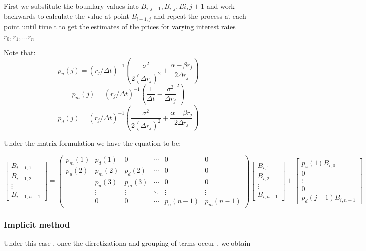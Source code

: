 \documentclass[12pt,a4paper]{article}
\begin{document}
First we substitute the boundary values into $B_{i,j-1}, B_{i,j}, B{i,j+1}$ and work backwards to calculate the value at point $B_{i-1,j}$ and repeat the process at each point until time t to get the estimates of the prices for varying interest rates $r_0,r_1,...r_n$ 

Note that:       
$$p_u(j)=(r_j/\Delta t)^{-1}(\frac{\sigma^{2}}{2(\Delta r_j)^{2}}+\frac{\alpha-\beta r_j}{2\Delta r_j})$$
$$p_m(j)=(r_j/\Delta t)^{-1}(\frac{1}{\Delta t}-\frac{\sigma^2}{\Delta r_j}^{2})$$
$$p_d(j)=(r_j/\Delta t)^{-1}(\frac{\sigma^{2}}{2(\Delta r_j)^{2}}+\frac{\alpha-\beta r_j}{2\Delta r_j})$$

Under the matrix formulation we have the equation to be:

$$\begin{bmatrix}
	B_{i-1,1} \\
	B_{i-1,2} \\
	\vdots \\       
	B_{i-1,n-1}
	\end{bmatrix}
=
\left( \begin{array}{cccccc}
p_m(1) & p_d(1) & 0 & \cdots  & 0 & 0\\
p_u(2) & p_m(2) & p_d(2) &\cdots & 0 & 0 \\
& p_u(3) & p_m(3) & \cdots & 0 & 0  \\
& \vdots &\vdots & \ddots & \vdots & \vdots \\ 
& 0 & 0 & \cdots & p_u(n-1) & p_m(n-1) \end{array} \right) 
%
\begin{bmatrix}
	B_{i,1} \\
	B_{i,2} \\
	\vdots \\       
	B_{i,n-1}
\end{bmatrix}
+
 \begin{bmatrix}
	p_u(1)B_{i,0} \\
	0 \\
	\vdots \\
	0 \\
	p_d(j-1)B_{i,n-1}
	\end{bmatrix}  
$$
 
 
 
\subsubsection{ Implicit method}

Under this case , once the dicretizationa and grouping of terms occur , we obtain
\end{document}
